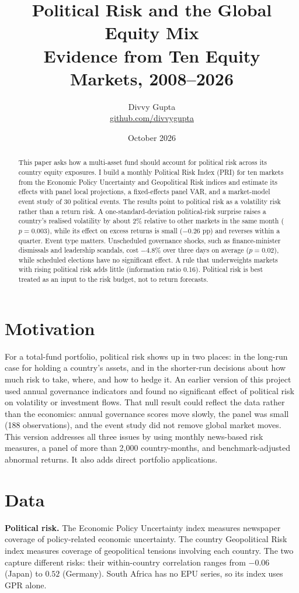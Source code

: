\documentclass[11pt]{article}
\title{\textbf{Political Risk and the Global Equity Mix}\\[4pt]
\large Evidence from Ten Equity Markets, 2008--2026}
\author{Divvy Gupta\\ \small\href{https://github.com/divvygupta}{github.com/divvygupta}}
\date{October 2026}
\begin{document}
\maketitle

\begin{abstract}
\noindent This paper asks how a multi-asset fund should account for political risk across its country equity exposures. I build a monthly Political Risk Index (PRI) for ten markets from the Economic Policy Uncertainty and Geopolitical Risk indices and estimate its effects with panel local projections, a fixed-effects panel VAR, and a market-model event study of 30 political events. The results point to political risk as a volatility risk rather than a return risk. A one-standard-deviation political-risk surprise raises a country's realised volatility by about 2\% relative to other markets in the same month ($p = 0.003$), while its effect on excess returns is small ($-0.26$ pp) and reverses within a quarter. Event type matters. Unscheduled governance shocks, such as finance-minister dismissals and leadership scandals, cost $-4.8\%$ over three days on average ($p = 0.02$), while scheduled elections have no significant effect. A rule that underweights markets with rising political risk adds little (information ratio 0.16). Political risk is best treated as an input to the risk budget, not to return forecasts.
\end{abstract}

\section{Motivation}
For a total-fund portfolio, political risk shows up in two places: in the long-run case for holding a country's assets, and in the shorter-run decisions about how much risk to take, where, and how to hedge it. An earlier version of this project used annual governance indicators and found no significant effect of political risk on volatility or investment flows. That null result could reflect the data rather than the economics: annual governance scores move slowly, the panel was small (188 observations), and the event study did not remove global market moves. This version addresses all three issues by using monthly news-based risk measures, a panel of more than 2,000 country-months, and benchmark-adjusted abnormal returns. It also adds direct portfolio applications.

\section{Data}
\textbf{Political risk.} The Economic Policy Uncertainty index \citep{bbd2016} measures newspaper coverage of policy-related economic uncertainty. The country Geopolitical Risk index \citep{ci2022} measures coverage of geopolitical tensions involving each country. The two capture different risks: their within-country correlation ranges from $-0.06$ (Japan) to $0.52$ (Germany). South Africa has no EPU series, so its index uses GPR alone.
\end{document}
